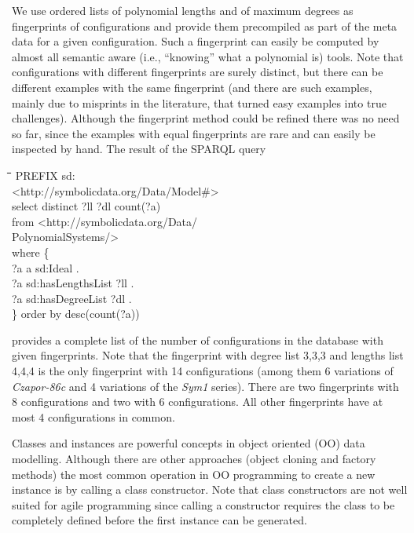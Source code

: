 \documentclass[a4paper,11pt]{article}
\newenvironment{code}{\par\small\tt\footnotesize \begin{tabbing}
\hskip12pt\=\hskip12pt\=\hskip12pt\=\hskip12pt\=\hskip5cm\=\hskip5cm\=\kill}
{\end{tabbing}\normalsize}
\begin{document}
\begin{multicols}{2}
We use ordered lists of polynomial lengths and of maximum degrees as
fingerprints of configurations and provide them precompiled as part of the meta
data for a given configuration.  Such a fingerprint can easily be computed by
almost all semantic aware (i.e., ``knowing'' what a polynomial is) tools.
Note that configurations with different fingerprints are surely distinct, but
there can be different examples with the same fingerprint (and there are such
examples, mainly due to misprints in the literature, that turned easy examples
into true challenges).  Although the fingerprint method could be refined there
was no need so far, since the examples with equal fingerprints are rare and
can easily be inspected by hand.  The result of the SPARQL query
\begin{code}
PREFIX sd:\\\> <http://symbolicdata.org/Data/Model\#> \\ 
select distinct ?ll ?dl count(?a)\\ from  
<http://symbolicdata.org/Data/\\\> PolynomialSystems/>\\
where \{\+\\
?a a sd:Ideal . \\
?a sd:hasLengthsList ?ll .\\ 
?a sd:hasDegreeList ?dl . \-\\
\} order by desc(count(?a))
\end{code}
provides a complete list of the number of configurations in the database with
given fingerprints. Note that the fingerprint with degree list {\dq}3,3,3{\dq}
and lengths list {\dq}4,4,4{\dq} is the only fingerprint with 14
configurations (among them 6 variations of \emph{Czapor-86c} and 4 variations
of the \emph{Sym1} series). There are two fingerprints with 8 configurations
and two with 6 configurations. All other fingerprints have at most 4
configurations in common.


Classes and instances are powerful concepts in object oriented (OO) data
modelling.  Although there are other approaches (object cloning and factory
methods) the most common operation in OO programming to create a new instance
is by calling a class constructor.  Note that class constructors are not well
suited for agile programming since calling a constructor requires the class to
be completely defined before the first instance can be generated.


\end{multicols}
\end{document}
